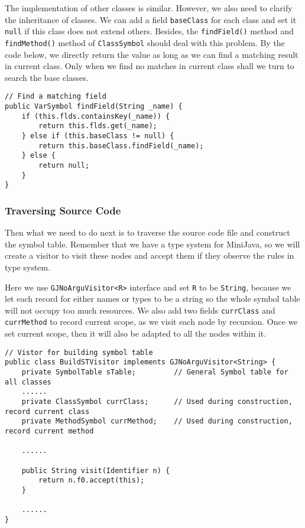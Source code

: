 \documentclass[letterpaper, 14pt]{article}
\begin{document}
The implementation of other classes is similar. However, we also need to clarify the inheritance of classes. We can add a field \texttt{baseClass} for each class and set it \texttt{null} if this class does not extend others. Besides, the \texttt{findField()} method and \texttt{findMethod()} method of \texttt{ClassSymbol} should deal with this problem. By the code below, we directly return the value as long as we can find a matching result in current class. Only when we find no matches in current class shall we turn to search the base classes. 
\begin{lstlisting}
// Find a matching field
public VarSymbol findField(String _name) {
	if (this.flds.containsKey(_name)) {
		return this.flds.get(_name);
	} else if (this.baseClass != null) {
		return this.baseClass.findField(_name);
	} else {
		return null;
	}
}
\end{lstlisting}

\subsubsection{Traversing Source Code}

Then what we need to do next is to traverse the source code file and construct the symbol table. Remember that we have a type system for MiniJava, so we will create a visitor to visit these nodes and accept them if they observe the rules in type system. 

Here we use \texttt{GJNoArguVisitor<R>} interface and set \texttt{R} to be \texttt{String}, because we let each record for either names or types to be a string so the whole symbol table will not occupy too much resources. We also add two fields \texttt{currClass} and \texttt{currMethod} to record current scope, as we visit each node
by recursion. Once we set current scope, then it will also be adapted to all the nodes within it. 
\begin{lstlisting}
// Vistor for building symbol table
public class BuildSTVisitor implements GJNoArguVisitor<String> {
	private SymbolTable sTable;			// General Symbol table for all classes
	......
	private ClassSymbol currClass;		// Used during construction, record current class
	private MethodSymbol currMethod;	// Used during construction, record current method

	......

	public String visit(Identifier n) {
		return n.f0.accept(this);
	}
	
	......
}
\end{lstlisting}
\end{document}
